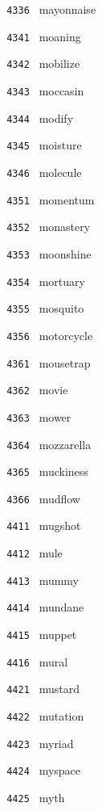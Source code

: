 \documentclass[11pt]{article}
\begin{document}
\begin{multicols}{6}
\noindent \texttt{ 4336 } mayonnaise  \par
\vspace{3mm}
\noindent \texttt{ 4341 } moaning  \par
\noindent \texttt{ 4342 } mobilize  \par
\noindent \texttt{ 4343 } moccasin  \par
\noindent \texttt{ 4344 } modify  \par
\noindent \texttt{ 4345 } moisture  \par
\noindent \texttt{ 4346 } molecule  \par
\vspace{3mm}
\noindent \texttt{ 4351 } momentum  \par
\noindent \texttt{ 4352 } monastery  \par
\noindent \texttt{ 4353 } moonshine  \par
\noindent \texttt{ 4354 } mortuary  \par
\noindent \texttt{ 4355 } mosquito  \par
\noindent \texttt{ 4356 } motorcycle  \par
\vspace{3mm}
\noindent \texttt{ 4361 } mousetrap  \par
\noindent \texttt{ 4362 } movie  \par
\noindent \texttt{ 4363 } mower  \par
\noindent \texttt{ 4364 } mozzarella  \par
\noindent \texttt{ 4365 } muckiness  \par
\noindent \texttt{ 4366 } mudflow  \par
\noindent \texttt{ 4411 } mugshot  \par
\noindent \texttt{ 4412 } mule  \par
\noindent \texttt{ 4413 } mummy  \par
\noindent \texttt{ 4414 } mundane  \par
\noindent \texttt{ 4415 } muppet  \par
\noindent \texttt{ 4416 } mural  \par
\vspace{3mm}
\noindent \texttt{ 4421 } mustard  \par
\noindent \texttt{ 4422 } mutation  \par
\noindent \texttt{ 4423 } myriad  \par
\noindent \texttt{ 4424 } myspace  \par
\noindent \texttt{ 4425 } myth  \par

\end{multicols}
\end{document}
